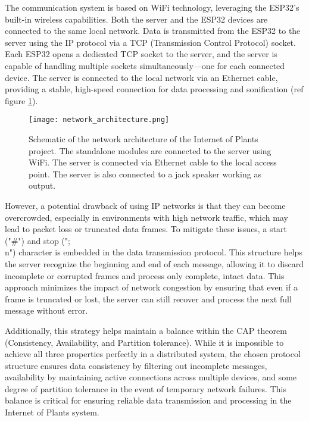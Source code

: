 The communication system is based on WiFi technology, leveraging the ESP32's built-in wireless capabilities. Both the server and the ESP32 devices are connected to the same local network. Data is transmitted from the ESP32 to the server using the IP protocol via a TCP (Transmission Control Protocol) socket. Each ESP32 opens a dedicated TCP socket to the server, and the server is capable of handling multiple sockets simultaneously—one for each connected device. The server is connected to the local network via an Ethernet cable, providing a stable, high-speed connection for data processing and sonification (ref figure \ref{fig:network_architecture}).

\begin{figure}[h]
    \centering
    \texttt{[image: network\_architecture.png]}
    \caption{Schematic of the network architecture of the Internet of Plants project. The standalone modules are connected to the server using WiFi. The server is connected via Ethernet cable to the local access point. The server is also connected to a jack speaker working as output.}
    \vspace{0.1cm}
    \label{fig:network_architecture}
\end{figure}

However, a potential drawback of using IP networks is that they can become overcrowded, especially in environments with high network traffic, which may lead to packet loss or truncated data frames. To mitigate these issues, a start ("#") and stop (";\\n") character is embedded in the data transmission protocol. This structure helps the server recognize the beginning and end of each message, allowing it to discard incomplete or corrupted frames and process only complete, intact data. This approach minimizes the impact of network congestion by ensuring that even if a frame is truncated or lost, the server can still recover and process the next full message without error.

Additionally, this strategy helps maintain a balance within the CAP theorem (Consistency, Availability, and Partition tolerance). While it is impossible to achieve all three properties perfectly in a distributed system, the chosen protocol structure ensures data consistency by filtering out incomplete messages, availability by maintaining active connections across multiple devices, and some degree of partition tolerance in the event of temporary network failures. This balance is critical for ensuring reliable data transmission and processing in the Internet of Plants system.





